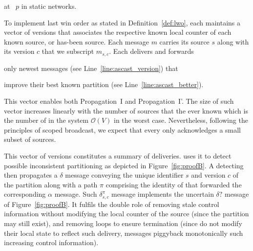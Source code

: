 \begin{algorithm}
  
  \caption{\label{algo:ascast}\NAME at \Process~$p$ in static networks.}
\end{algorithm}

To implement last win order as stated in Definition~\ref{def:lwo},
each \process maintains a vector of versions that associates the
respective known local counter of each known source, or has-been
source. Each message $m$ carries its source $s$ along with its version
$c$ that we subscript $m_{s, c}$.  Each \process delivers and forwards
\begin{inparaenum}[(i)]
\item only newest messages (see Line~\ref{line:ascast_version}) that
\item improve their best known partition (see
  Line~\ref{line:ascast_better}).
\end{inparaenum}
This vector enables both Propagation~I and Propagation~I'.  The size
of such vector increases linearly with the number of sources that the
\process ever known which is the number of \processes in the system
$\mathcal{O}(V)$ in the worst case.
Nevertheless, following the principles of scoped broadcast, we expect
that every \process only acknowledges a small subset of sources.

This vector of versions constitutes a summary of deliveries. \NAME
uses it to detect possible inconsistent partitioning as depicted in
Figure~\ref{fig:proofB}. A detecting \process then propagates a
$\delta$ message conveying the unique identifier $s$ and version $c$
of the partition along with a path $\pi$ comprising the identity of
\processes that forwarded the corresponding $\alpha$ message. Such
$\delta_{s, c}^{\pi}$ message implements the uncertain $\delta?$
message of Figure~\ref{fig:proofB}. It fulfils the double role of
removing stale control information without modifying the local counter
of the source (since the partition may still exist), and removing
loops to ensure termination (since \processes do not modify their
local state to reflect such delivery, messages piggyback monotonically
such increasing control information).

